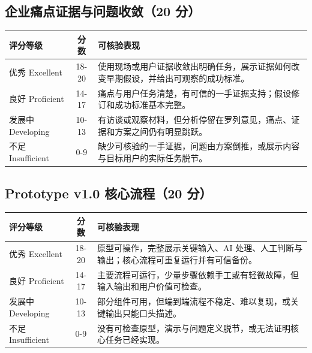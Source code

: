 \documentclass[11pt]{article}
\newcommand{\formaltable}{%
  \small
  \setlength{\tabcolsep}{5pt}%
  \renewcommand{\arraystretch}{1.2}%
  \setlength{\arrayrulewidth}{0.4pt}%
}
\renewcommand{\arraystretch}{1.2}
\begin{document}
\subsection{企业痛点证据与问题收敛（20 分）}
\begin{center}
\formaltable
\begin{tabularx}{\textwidth}{|l|c|Y|}
\hline
\textbf{评分等级} & \textbf{分数} & \textbf{可核验表现} \\ \hline
优秀 Excellent & 18-20 & 使用现场或用户证据收敛出明确任务，展示证据如何改变早期假设，并给出可观察的成功标准。 \\ \hline
良好 Proficient & 14-17 & 痛点与用户任务清楚，有可信的一手证据支持；假设修订和成功标准基本完整。 \\ \hline
发展中 Developing & 10-13 & 有访谈或观察材料，但分析停留在罗列意见，痛点、证据和方案之间仍有明显跳跃。 \\ \hline
不足 Insufficient & 0-9 & 缺少可核验的一手证据，问题由方案倒推，或展示内容与目标用户的实际任务脱节。 \\ \hline
\end{tabularx}
\end{center}

\subsection{Prototype v1.0 核心流程（20 分）}
\begin{center}
\formaltable
\begin{tabularx}{\textwidth}{|l|c|Y|}
\hline
\textbf{评分等级} & \textbf{分数} & \textbf{可核验表现} \\ \hline
优秀 Excellent & 18-20 & 原型可操作，完整展示关键输入、AI 处理、人工判断与输出；核心流程可重复运行并有可信备份。 \\ \hline
良好 Proficient & 14-17 & 主要流程可运行，少量步骤依赖手工或有轻微故障，但输入输出和用户价值可检查。 \\ \hline
发展中 Developing & 10-13 & 部分组件可用，但端到端流程不稳定、难以复现，或关键输出只能口头描述。 \\ \hline
不足 Insufficient & 0-9 & 没有可检查原型，演示与问题定义脱节，或无法证明核心任务已经实现。 \\ \hline
\end{tabularx}
\end{center}
\end{document}
